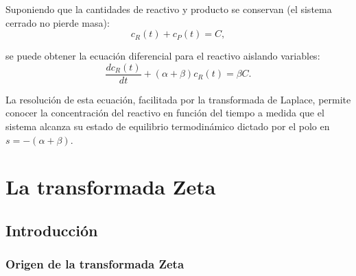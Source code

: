 \documentclass[11pt,a4paper,openany]{book}
\begin{document}
Suponiendo que la cantidades de reactivo y producto se conservan (el sistema cerrado no pierde masa):
\begin{equation}
	c_{R}(t) + c_{P}(t) = C,
\end{equation}

se puede obtener la ecuaci\'{o}n diferencial para el reactivo aislando variables:
\begin{equation}
	\frac{dc_{R}(t)}{dt} + (\alpha + \beta) c_{R}(t) = \beta C.  \label{sisTres}
\end{equation}

La resolución de esta ecuación, facilitada por la transformada de Laplace, permite conocer la concentración del reactivo en función del tiempo a medida que el sistema alcanza su estado de equilibrio termodinámico dictado por el polo en $s = -(\alpha + \beta)$.


\chapter{La transformada Zeta}

\section{Introducci\'{o}n}

\subsection{Origen de la transformada Zeta}
\end{document}
